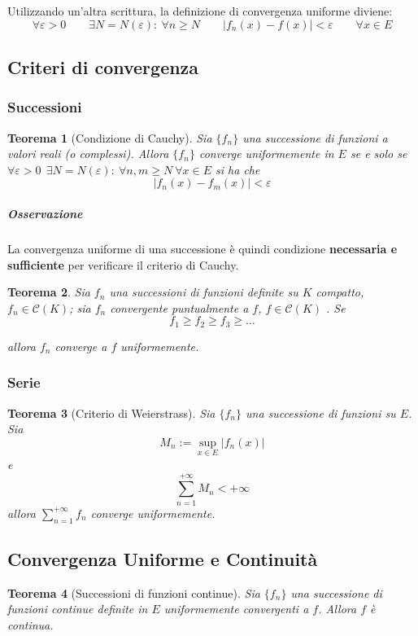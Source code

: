 \documentclass[a4paper,12pt]{article}
\newcommand{\cont}{\mathscr{C}}
\newtheorem{teo}{Teorema}
\begin{document}
Utilizzando un'altra scrittura, la definizione di convergenza uniforme diviene:
 $$\forall \varepsilon>0\qquad \exists N=N(\varepsilon):\ \forall n \geq N\qquad |f_n(x) - f(x)| < \varepsilon\qquad \forall x\in E$$ 

\subsection{Criteri di convergenza}

\subsubsection{Successioni}
\begin{teo}[Condizione di Cauchy]
Sia $\{f_n\}$ una successione di funzioni a valori reali (o complessi). Allora $\{f_n\}$ converge uniformemente in $E$ se e solo se $\forall \varepsilon>0\ \ \exists N=N(\varepsilon):\ \forall n,m \geq N\ \forall x\in E$ si ha che 
$$|f_n(x) - f_m(x)| < \varepsilon$$
\end{teo}
\subparagraph*{Osservazione}
La convergenza uniforme di una successione è quindi condizione \textbf{necessaria e sufficiente} per verificare il criterio di Cauchy.
\begin{teo}
Sia ${f_n}$ una successioni di funzioni definite su $K$ compatto, $f_n \in \cont(K)$; sia $f_n$ convergente puntualmente a $f$,   $f \in \cont(K)$ . Se
\begin{displaymath}
f_1 \geq f_2 \geq f_3 \geq \dots
\end{displaymath}

allora $f_n$ converge a $f$ uniformemente.
\end{teo}
\subsubsection{Serie}

\begin{teo}[Criterio di Weierstrass]
Sia $\{f_n\}$ una successione di funzioni su $E$. Sia $$M_n:= \displaystyle\sup_{x\in E}|f_n(x)|$$ e $$\sum_{n=1}^{+\infty}M_n<+\infty$$
allora $\displaystyle\sum_{n=1}^{+\infty}f_n$ converge uniformemente.
\end{teo}
\subsection{Convergenza Uniforme e Continuità}
\begin{teo}[Successioni di funzioni continue]
Sia $\{f_n\}$ una successione di funzioni continue definite in $E$ uniformemente convergenti a $f$. Allora $f$ è continua.
\end{teo}
\end{document}
